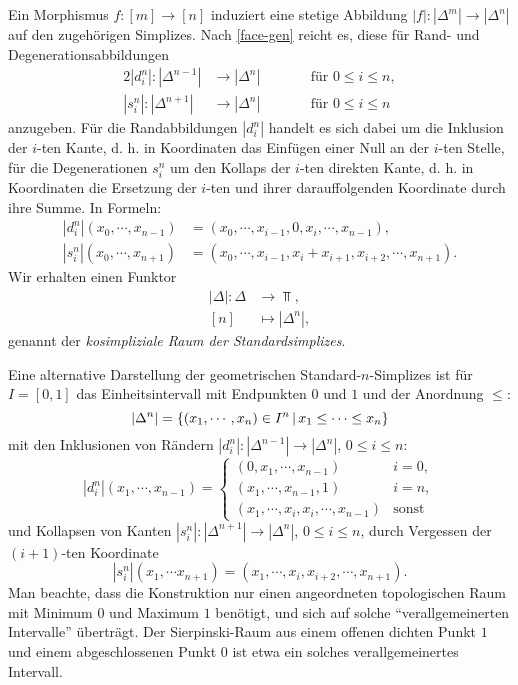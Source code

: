 Ein Morphismus $f: [m] \to [n]$ induziert eine stetige Abbildung $|f|:
|\Delta^m| \to |\Delta^n|$ auf den zugehörigen Simplizes. Nach
\ref{face-gen} reicht es, diese für Rand- und Degenerationsabbildungen
\begin{alignat*}{2}
  |d_i^n|: |\Delta^{n-1}| &\to |\Delta^n| \qquad && \text{für } 0 \leq i \leq n, \\
  |s_i^n|: |\Delta^{n+1}| &\to |\Delta^n| && \text{für } 0 \leq i \leq n
\end{alignat*}
anzugeben. Für die Randabbildungen $|d_i^n|$ handelt es sich dabei um
die Inklusion der $i$-ten Kante, d. h. in Koordinaten das Einfügen
einer Null an der $i$-ten Stelle, für die Degenerationen $s_i^n$ um
den Kollaps der $i$-ten direkten Kante, d. h. in Koordinaten die
Ersetzung der $i$-ten und ihrer darauffolgenden Koordinate durch ihre
Summe. In Formeln:
\begin{align} \label{eq:cosimp-space}
  |d_i^n|(x_0, \cdots, x_{n-1})
  &= (x_0, \cdots, x_{i-1}, 0, x_i, \cdots, x_{n-1}), \\
  |s_i^n|(x_0, \cdots, x_{n+1})
  &= (x_0, \cdots, x_{i-1}, x_i + x_{i+1}, x_{i+2}, \cdots, x_{n+1}).
\end{align}
Wir erhalten einen Funktor
\begin{align*}
  |\Delta|: \Delta &\to \Top, \\
  [n] &\mapsto |\Delta^n|,
\end{align*}
genannt der \emph{kosimpliziale Raum der Standardsimplizes}.

\begin{bem} \label{gen-intervall}
  Eine alternative Darstellung der geometrischen
  Standard-$n$-Simplizes ist für $I = [0, 1]$ das Einheitsintervall
  mit Endpunkten $0$ und $1$ und der Anordnung $\leq$:
  \[ |\Delta^n| = \left\{ (x_1, \cdots, x_n) \in I^n \,\middle|\, x_1 \leq \cdots \leq x_n \right\} \]
  mit den Inklusionen von Rändern $|d_i^n|: |\Delta^{n-1}| \to
  |\Delta^n|$, $0 \leq i \leq n$:
  \[ |d_i^n|(x_1, \cdots, x_{n-1}) = 
  \begin{cases}
    (0, x_1, \cdots, x_{n-1}) & i = 0, \\ (x_1, \cdots, x_{n-1}, 1) &
    i = n, \\ (x_1, \cdots, x_i, x_i, \cdots, x_{n-1}) & \text{sonst}
  \end{cases}
  \]
  und Kollapsen von Kanten $|s_i^n|: |\Delta^{n+1}| \to |\Delta^{n}|$,
  $0 \leq i \leq n$, durch Vergessen der $(i+1)$-ten Koordinate
  \[ |s_i^n|(x_1, \cdots x_{n+1}) =
  (x_1, \cdots, x_i, x_{i+2}, \cdots, x_{n+1}).
  \]
  Man beachte, dass die Konstruktion nur einen angeordneten
  topologischen Raum mit Minimum $0$ und Maximum $1$ benötigt, und
  sich auf solche ``verallgemeinerten Intervalle'' überträgt. Der
  Sierpinski-Raum aus einem offenen dichten Punkt $1$ und einem
  abgeschlossenen Punkt $0$ ist etwa ein solches verallgemeinertes
  Intervall.
\end{bem}

